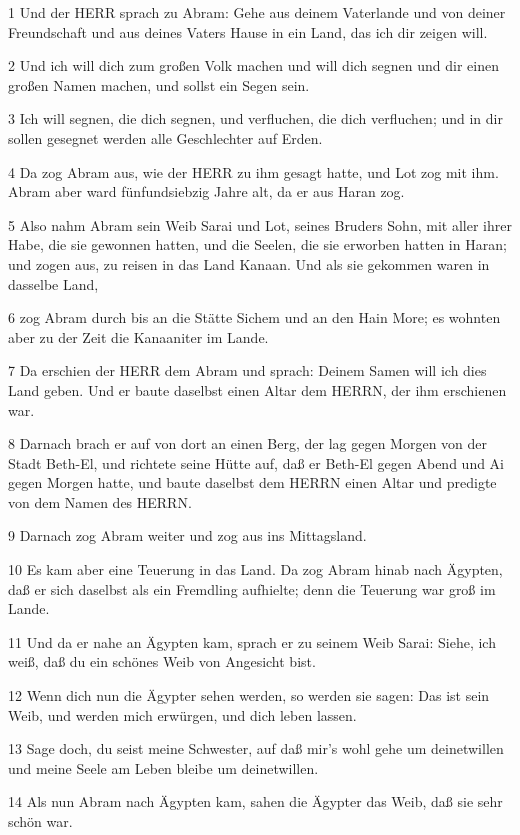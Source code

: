 \par 1 Und der HERR sprach zu Abram: Gehe aus deinem Vaterlande und von deiner Freundschaft und aus deines Vaters Hause in ein Land, das ich dir zeigen will.
\par 2 Und ich will dich zum großen Volk machen und will dich segnen und dir einen großen Namen machen, und sollst ein Segen sein.
\par 3 Ich will segnen, die dich segnen, und verfluchen, die dich verfluchen; und in dir sollen gesegnet werden alle Geschlechter auf Erden.
\par 4 Da zog Abram aus, wie der HERR zu ihm gesagt hatte, und Lot zog mit ihm. Abram aber ward fünfundsiebzig Jahre alt, da er aus Haran zog.
\par 5 Also nahm Abram sein Weib Sarai und Lot, seines Bruders Sohn, mit aller ihrer Habe, die sie gewonnen hatten, und die Seelen, die sie erworben hatten in Haran; und zogen aus, zu reisen in das Land Kanaan. Und als sie gekommen waren in dasselbe Land,
\par 6 zog Abram durch bis an die Stätte Sichem und an den Hain More; es wohnten aber zu der Zeit die Kanaaniter im Lande.
\par 7 Da erschien der HERR dem Abram und sprach: Deinem Samen will ich dies Land geben. Und er baute daselbst einen Altar dem HERRN, der ihm erschienen war.
\par 8 Darnach brach er auf von dort an einen Berg, der lag gegen Morgen von der Stadt Beth-El, und richtete seine Hütte auf, daß er Beth-El gegen Abend und Ai gegen Morgen hatte, und baute daselbst dem HERRN einen Altar und predigte von dem Namen des HERRN.
\par 9 Darnach zog Abram weiter und zog aus ins Mittagsland.
\par 10 Es kam aber eine Teuerung in das Land. Da zog Abram hinab nach Ägypten, daß er sich daselbst als ein Fremdling aufhielte; denn die Teuerung war groß im Lande.
\par 11 Und da er nahe an Ägypten kam, sprach er zu seinem Weib Sarai: Siehe, ich weiß, daß du ein schönes Weib von Angesicht bist.
\par 12 Wenn dich nun die Ägypter sehen werden, so werden sie sagen: Das ist sein Weib, und werden mich erwürgen, und dich leben lassen.
\par 13 Sage doch, du seist meine Schwester, auf daß mir's wohl gehe um deinetwillen und meine Seele am Leben bleibe um deinetwillen.
\par 14 Als nun Abram nach Ägypten kam, sahen die Ägypter das Weib, daß sie sehr schön war.
